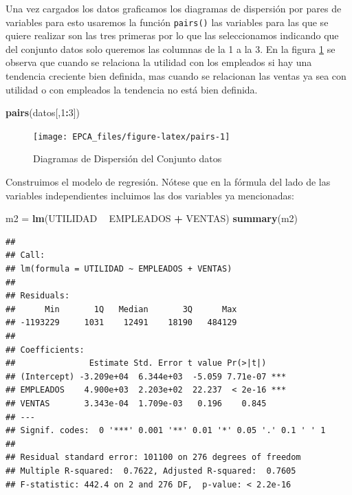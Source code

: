 \documentclass[
]{krantz}
\makeatletter
\newenvironment{Shaded}{\begin{snugshade}}{\end{snugshade}}
\newcommand{\DecValTok}[1]{\textcolor[rgb]{0.06,0.06,0.06}{#1}}
\newcommand{\KeywordTok}[1]{\textcolor[rgb]{0.27,0.27,0.27}{\textbf{#1}}}
\newcommand{\NormalTok}[1]{#1}
\newcommand{\OperatorTok}[1]{\textcolor[rgb]{0.43,0.43,0.43}{\textbf{#1}}}
\newcommand{\StringTok}[1]{\textcolor[rgb]{0.5,0.5,0.5}{#1}}
\newenvironment{kframe}{%
\medskip{}
\setlength{\fboxsep}{.8em}
 \def\at@end@of@kframe{}%
 \ifinner\ifhmode%
  \def\at@end@of@kframe{\end{minipage}}%
  \begin{minipage}{\columnwidth}%
 \fi\fi%
 \def\FrameCommand##1{\hskip\@totalleftmargin \hskip-\fboxsep
 \colorbox{shadecolor}{##1}\hskip-\fboxsep
     \hskip-\linewidth \hskip-\@totalleftmargin \hskip\columnwidth}%
 \MakeFramed {\advance\hsize-\width
   \@totalleftmargin\z@ \linewidth\hsize
   \@setminipage}}%
 {\par\unskip\endMakeFramed%
 \at@end@of@kframe}
\renewenvironment{Shaded}{\begin{kframe}}{\end{kframe}}
\makeatother
\begin{document}
Una vez cargados los datos graficamos los diagramas de dispersión por pares de variables para esto usaremos la función \texttt{pairs()} las variables para las que se quiere realizar son las tres primeras por lo que las seleccionamos indicando que del conjunto datos solo queremos las columnas de la 1 a la 3. En la figura \ref{fig:pairs} se observa que cuando se relaciona la utilidad con los empleados si hay una tendencia creciente bien definida, mas cuando se relacionan las ventas ya sea con utilidad o con empleados la tendencia no está bien definida.

\begin{Shaded}
\begin{Highlighting}[]
\KeywordTok{pairs}\NormalTok{(datos[,}\DecValTok{1}\OperatorTok{:}\DecValTok{3}\NormalTok{])}
\end{Highlighting}
\end{Shaded}

\begin{figure}[!h]

{\centering \texttt{[image: EPCA\_files/figure-latex/pairs-1]} 

}

\caption{Diagramas de Dispersión del Conjunto datos}\label{fig:pairs}
\end{figure}

Construimos el modelo de regresión. Nótese que en la fórmula del lado de las variables independientes incluimos las dos variables ya mencionadas:

\begin{Shaded}
\begin{Highlighting}[]
\NormalTok{m2 =}\StringTok{ }\KeywordTok{lm}\NormalTok{(UTILIDAD }\OperatorTok{~}\StringTok{ }\NormalTok{EMPLEADOS }\OperatorTok{+}\StringTok{ }\NormalTok{VENTAS)}
\KeywordTok{summary}\NormalTok{(m2)}
\end{Highlighting}
\end{Shaded}

\begin{verbatim}
## 
## Call:
## lm(formula = UTILIDAD ~ EMPLEADOS + VENTAS)
## 
## Residuals:
##      Min       1Q   Median       3Q      Max 
## -1193229     1031    12491    18190   484129 
## 
## Coefficients:
##               Estimate Std. Error t value Pr(>|t|)    
## (Intercept) -3.209e+04  6.344e+03  -5.059 7.71e-07 ***
## EMPLEADOS    4.900e+03  2.203e+02  22.237  < 2e-16 ***
## VENTAS       3.343e-04  1.709e-03   0.196    0.845    
## ---
## Signif. codes:  0 '***' 0.001 '**' 0.01 '*' 0.05 '.' 0.1 ' ' 1
## 
## Residual standard error: 101100 on 276 degrees of freedom
## Multiple R-squared:  0.7622, Adjusted R-squared:  0.7605 
## F-statistic: 442.4 on 2 and 276 DF,  p-value: < 2.2e-16
\end{verbatim}
\end{document}
